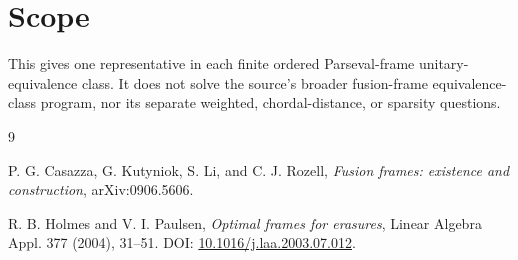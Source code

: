 \documentclass[11pt]{article}
\begin{document}
\section*{Scope}

This gives one representative in each finite ordered Parseval-frame
unitary-equivalence class. It does not solve the source's broader fusion-frame
equivalence-class program, nor its separate weighted, chordal-distance, or
sparsity questions.

\begin{thebibliography}{9}

P. G. Casazza, G. Kutyniok, S. Li, and C. J. Rozell,
\emph{Fusion frames: existence and construction},
arXiv:0906.5606.

R. B. Holmes and V. I. Paulsen,
\emph{Optimal frames for erasures},
Linear Algebra Appl. 377 (2004), 31--51.
DOI: \href{https://doi.org/10.1016/j.laa.2003.07.012}{10.1016/j.laa.2003.07.012}.

\end{thebibliography}
\end{document}
